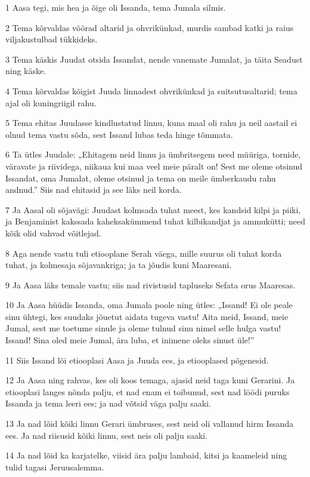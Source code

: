 \par 1 Aasa tegi, mis hea ja õige oli Issanda, tema Jumala silmis.
\par 2 Tema kõrvaldas võõrad altarid ja ohvrikünkad, murdis sambad katki ja raius viljakustulbad tükkideks.
\par 3 Tema käskis Juudat otsida Issandat, nende vanemate Jumalat, ja täita Seadust ning käske.
\par 4 Tema kõrvaldas kõigist Juuda linnadest ohvrikünkad ja suitsutusaltarid; tema ajal oli kuningriigil rahu.
\par 5 Tema ehitas Juudasse kindlustatud linnu, kuna maal oli rahu ja neil aastail ei olnud tema vastu sõda, sest Issand lubas teda hinge tõmmata.
\par 6 Ta ütles Juudale: „Ehitagem neid linnu ja ümbritsegem need müüriga, tornide, väravate ja riividega, niikaua kui maa veel meie päralt on! Sest me oleme otsinud Issandat, oma Jumalat, oleme otsinud ja tema on meile ümberkaudu rahu andnud.” Siis nad ehitasid ja see läks neil korda.
\par 7 Ja Aasal oli sõjavägi: Juudast kolmsada tuhat meest, kes kandsid kilpi ja piiki, ja Benjaminist kakssada kaheksakümmend tuhat kilbikandjat ja ammukütti; need kõik olid vahvad võitlejad.
\par 8 Aga nende vastu tuli etiooplane Serah väega, mille suurus oli tuhat korda tuhat, ja kolmesaja sõjavankriga; ja ta jõudis kuni Maaresani.
\par 9 Ja Aasa läks temale vastu; siis nad rivistusid tapluseks Sefata orus Maaresas.
\par 10 Ja Aasa hüüdis Issanda, oma Jumala poole ning ütles: „Issand! Ei ole peale sinu ühtegi, kes suudaks jõuetut aidata tugeva vastu! Aita meid, Issand, meie Jumal, sest me toetume sinule ja oleme tulnud sinu nimel selle hulga vastu! Issand! Sina oled meie Jumal, ära luba, et inimene oleks sinust üle!”
\par 11 Siis Issand lõi etiooplasi Aasa ja Juuda ees, ja etiooplased põgenesid.
\par 12 Ja Aasa ning rahvas, kes oli koos temaga, ajasid neid taga kuni Gerarini. Ja etiooplasi langes nõnda palju, et nad enam ei toibunud, sest nad löödi puruks Issanda ja tema leeri ees; ja nad võtsid väga palju saaki.
\par 13 Ja nad lõid kõiki linnu Gerari ümbruses, sest neid oli vallanud hirm Issanda ees. Ja nad riisusid kõiki linnu, sest neis oli palju saaki.
\par 14 Ja nad lõid ka karjatelke, viisid ära palju lambaid, kitsi ja kaameleid ning tulid tagasi Jeruusalemma.


